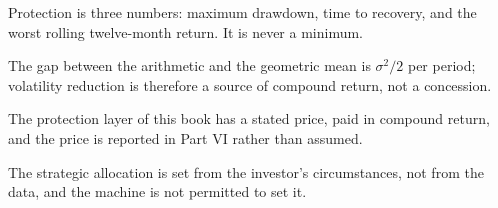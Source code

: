 \begin{keytakeaways}
\item Protection is three numbers: maximum drawdown, time to recovery, and
the worst rolling twelve-month return. It is never a minimum.
\item The gap between the arithmetic and the geometric mean is \(\sigma^2/2\)
per period; volatility reduction is therefore a source of compound return,
not a concession.
\item The protection layer of this book has a stated price, paid in compound
return, and the price is reported in Part VI rather than assumed.
\item The strategic allocation is set from the investor's circumstances, not
from the data, and the machine is not permitted to set it.
\end{keytakeaways}
